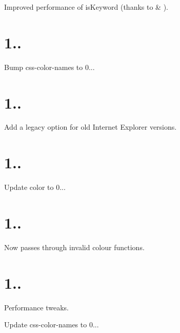 
\begin{DoxyItemize}
\item Improved performance of {\ttfamily is\+Keyword} (thanks to  \& ).
\end{DoxyItemize}

\section*{1..}


\begin{DoxyItemize}
\item Bump css-\/color-\/names to 0...
\end{DoxyItemize}

\section*{1..}


\begin{DoxyItemize}
\item Add a legacy option for old Internet Explorer versions.
\end{DoxyItemize}

\section*{1..}


\begin{DoxyItemize}
\item Update color to 0...
\end{DoxyItemize}

\section*{1..}


\begin{DoxyItemize}
\item Now passes through invalid colour functions.
\end{DoxyItemize}

\section*{1..}


\begin{DoxyItemize}
\item Performance tweaks.
\item Update css-\/color-\/names to 0...
\end{DoxyItemize}

